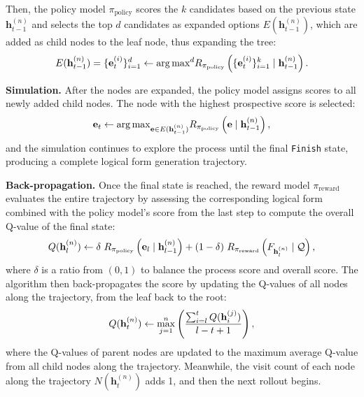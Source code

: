 \documentclass{article}
\theoremstyle{plain}
\theoremstyle{definition}
\theoremstyle{remark}
\begin{document}
Then, the policy model $\pi_{\text{policy}}$ scores the $k$ candidates based on the previous state $\mathbf{h}_{t-1}^{(n)}$ and selects the top $d$ candidates as expanded options $E(\mathbf{h}_{t-1}^{(n)})$, which are added as child nodes to the leaf node, thus expanding the tree: 
\begin{equation}
\label{E7}
\small
    E(\mathbf{h}_{t-1}^{(n)})=\{\mathbf{e}_t^{(i)}\}_{i=1}^d \gets {\arg\max}^d R_{\pi_{\text{policy}}}\left(\{\mathbf{e}_t^{(i)}\}_{i=1}^k \mid \mathbf{h}_{t-1}^{(n)} \right).
\end{equation}

\textbf{Simulation. }
After the nodes are expanded, the policy model assigns scores to all newly added child nodes. The node with the highest prospective score is selected:
\begin{equation}
\small
    \mathbf{e}_{t} \gets {\arg\max}_{\mathbf{e} \in E(\mathbf{h}^{(n)}_{t-1})} R_{\pi_{\text{policy}}}\left(\mathbf{e} \mid \mathbf{h}^{(n)}_{t-1}\right),
\end{equation}
and the simulation continues to explore the process until the final \texttt{Finish} state, producing a complete logical form generation trajectory.

\textbf{Back-propagation. }
Once the final state is reached, the reward model $\pi_{\text{reward}}$ evaluates the entire trajectory by assessing the corresponding logical form combined with the policy model's score from the last step to compute the overall Q-value of the final state:
\begin{equation}
\small
    Q(\mathbf{h}^{(n)}_l) \gets \delta\ R_{\pi_{\text{policy}}}\left(\mathbf{e}_l \mid \mathbf{h}^{(n)}_{l-1}\right) + (1-\delta)\ R_{\pi_{\text{reward}}}\left(F_{\mathbf{h}^{(n)}_{l}} \mid \mathcal{Q}\right),
\end{equation}
where $\delta$ is a ratio from $(0,1)$ to balance the process score and overall score. 
The algorithm then back-propagates the score by updating the Q-values of all nodes along the trajectory, from the leaf back to the root:
\begin{equation}
\small
    Q(\mathbf{h}_t^{(n)}) \gets \max_{j=1}^n\left(\frac{\sum_{i=l}^{t} Q(\mathbf{h}_i^{(j)})}{l - t + 1}\right),
\end{equation}
where the Q-values of parent nodes are updated to the maximum average Q-value from all child nodes along the trajectory. Meanwhile, the visit count of each node along the trajectory $N(\mathbf{h}_t^{(n)})$ adds 1, and then the next rollout begins.
\end{document}
